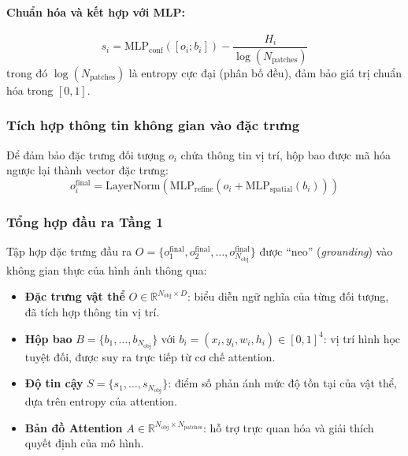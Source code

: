 \paragraph{Chuẩn hóa và kết hợp với MLP:}
\begin{equation}
    s_i = \text{MLP}_{\text{conf}}([o_i; b_i]) - \frac{H_i}{\log(N_{\text{patches}})}
\end{equation}
trong đó \(\log(N_{\text{patches}})\) là entropy cực đại (phân bố đều), đảm bảo giá trị chuẩn hóa trong \([0, 1]\).

\subsubsection{Tích hợp thông tin không gian vào đặc trưng}

Để đảm bảo đặc trưng đối tượng \(o_i\) chứa thông tin vị trí, hộp bao được mã hóa ngược lại thành vector đặc trưng:
\begin{equation}
    o_i^{\text{final}} = \text{LayerNorm}\left(\text{MLP}_{\text{refine}}\left(o_i + \text{MLP}_{\text{spatial}}(b_i)\right)\right)
\end{equation}

\subsubsection{Tổng hợp đầu ra Tầng 1}

Tập hợp đặc trưng đầu ra \(O = \{o_1^{\text{final}}, o_2^{\text{final}}, \dots, o_{N_{\text{obj}}}^{\text{final}}\}\) được ``neo'' (\textit{grounding}) vào không gian thực của hình ảnh thông qua:
\begin{itemize}
    \item \textbf{Đặc trưng vật thể} \(O \in \mathbb{R}^{N_{\text{obj}} \times D}\): biểu diễn ngữ nghĩa của từng đối tượng, đã tích hợp thông tin vị trí.
    \item \textbf{Hộp bao} \(B = \{b_1, \dots, b_{N_{\text{obj}}}\}\) với \(b_i = (x_i, y_i, w_i, h_i) \in [0,1]^4\): vị trí hình học tuyệt đối, được suy ra trực tiếp từ cơ chế attention.
    \item \textbf{Độ tin cậy} \(S = \{s_1, \dots, s_{N_{\text{obj}}}\}\): điểm số phản ánh mức độ tồn tại của vật thể, dựa trên entropy của attention.
    \item \textbf{Bản đồ Attention} \(A \in \mathbb{R}^{N_{\text{obj}} \times N_{\text{patches}}}\): hỗ trợ trực quan hóa và giải thích quyết định của mô hình.
\end{itemize}

